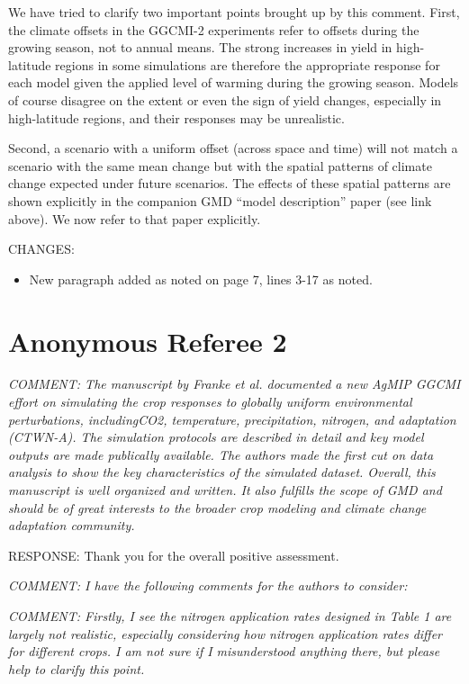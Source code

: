 \documentclass[gmd, manuscript]{copernicus} %
\begin{document}
We have tried to clarify two important points brought up by this comment. First, the climate offsets in the GGCMI-2 experiments refer to offsets during the growing season, not to annual means. The strong increases in yield in high-latitude regions in some simulations are therefore the appropriate response for each model given the applied level of warming during the growing season. Models of course disagree on the extent or even the sign of yield changes, especially in high-latitude regions, and their responses may be unrealistic.

Second, a scenario with a uniform offset (across space and time) will not match a scenario with the same mean change but with the spatial patterns of climate change expected under future scenarios. The effects of these spatial patterns are shown explicitly in the companion GMD “model description” paper (see link above). We now refer to that paper explicitly. 

CHANGES:
\begin{itemize}
    \item New paragraph added as noted on page 7, lines 3-17 as noted.
\end{itemize}

\clearpage
\section{Anonymous Referee 2}

\textcolor{dark-gray}{\textit{COMMENT: The manuscript by Franke et al. documented a new AgMIP GGCMI effort on simulating the crop responses to globally uniform environmental perturbations, includingCO2, temperature, precipitation, nitrogen, and adaptation (CTWN-A). The simulation protocols are described in detail and key model outputs are made publically available. The authors made the first cut on data analysis to show the key characteristics of the simulated dataset. Overall, this manuscript is well organized and written. It also fulfills the scope of GMD and should be of great interests to the broader crop modeling and climate change adaptation community.}} 

RESPONSE: Thank you for the overall positive assessment.
\smallskip

\textcolor{dark-gray}{\textit{COMMENT: I have the following comments for the authors to consider:}} 

\textcolor{dark-gray}{\textit{COMMENT: Firstly, I see the nitrogen application rates designed in Table 1 are largely not realistic, especially considering how nitrogen application rates differ for different crops. I am not sure if I misunderstood anything there, but please help to clarify this point.}} 
\end{document}

